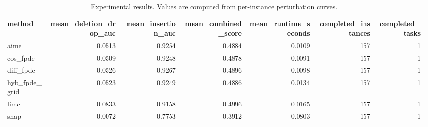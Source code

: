 \begin{table}[t]
\caption{Experimental results. Values are computed from per-instance perturbation curves.}
\label{tab:main_results_computed}
\centering
\begin{tabular}{lrrrrrr}
\toprule
method & mean\_deletion\_drop\_auc & mean\_insertion\_auc & mean\_combined\_score & mean\_runtime\_seconds & completed\_instances & completed\_tasks \\
\midrule
aime & 0.0513 & 0.9254 & 0.4884 & 0.0109 & 157 & 1 \\
cos\_fpde & 0.0509 & 0.9248 & 0.4878 & 0.0091 & 157 & 1 \\
diff\_fpde & 0.0526 & 0.9267 & 0.4896 & 0.0098 & 157 & 1 \\
hyb\_fpde\_grid & 0.0523 & 0.9249 & 0.4886 & 0.0134 & 157 & 1 \\
lime & 0.0833 & 0.9158 & 0.4996 & 0.0165 & 157 & 1 \\
shap & 0.0072 & 0.7753 & 0.3912 & 0.0803 & 157 & 1 \\
\bottomrule
\end{tabular}

\end{table}
